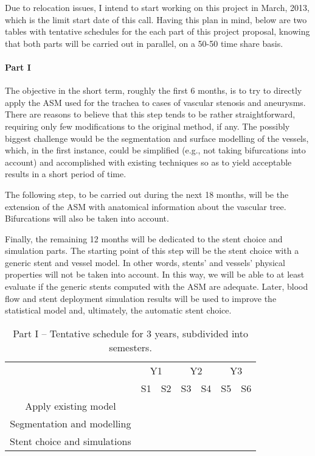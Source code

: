 Due to relocation issues, I intend to start working on this project in March, 2013, which is the limit start date of this call. Having this plan in mind, below are two tables with tentative schedules for the each part of this project proposal, knowing that both parts will be carried out in parallel, on a 50-50 time share basis.

\paragraph{Part I}
The objective in the short term, roughly the first 6 months, is to try to directly apply the ASM used for the trachea to cases of vascular stenosis and aneurysms. There are reasons to believe that this step tends to be rather straightforward, requiring only few modifications to the original method, if any. The possibly biggest challenge would be the segmentation and surface modelling of the vessels, which, in the first instance, could be simplified (e.g., not taking bifurcations into account) and accomplished with existing techniques so as to yield acceptable results in a short period of time. 

The following step, to be carried out during the next 18 months, will be the extension of the ASM with anatomical information about the vascular tree. Bifurcations will also be taken into account. 

Finally, the remaining 12 months will be dedicated to the stent choice and simulation parts. The starting point of this step will be the stent choice with a generic stent and vessel model. In other words, stents' and vessels' physical properties will not be taken into account. In this way, we will be able to at least evaluate if the generic stents computed with the ASM are adequate. Later, blood flow and stent deployment simulation results will be used to improve the statistical model and, ultimately, the automatic stent choice.  

\begin{table}[h]\centering
\begin{tabular}{c|c|c|c|c|c|c|}
\cline{2-7}
 & \multicolumn{2}{|c|}{Y1} & \multicolumn{2}{|c|}{Y2} & \multicolumn{2}{|c|}{Y3} \\ \cline{2-7}
 & S1 & S2 & S3 & S4 & S5 & S6 \\ \hline
\multicolumn{1}{|c|}{Apply existing model} & \cellcolor{green} & & & & & \\ \hline
\multicolumn{1}{|c|}{Segmentation and modelling} & & \cellcolor{green} & \cellcolor{green} & \cellcolor{green} & & \\ \hline
\multicolumn{1}{|c|}{Stent choice and simulations} & & & & & \cellcolor{green} & \cellcolor{green} \\ \hline
\end{tabular}
\caption{Part I -- Tentative schedule for 3 years, subdivided into semesters.}
\label{tab:schedule1}
\end{table}

